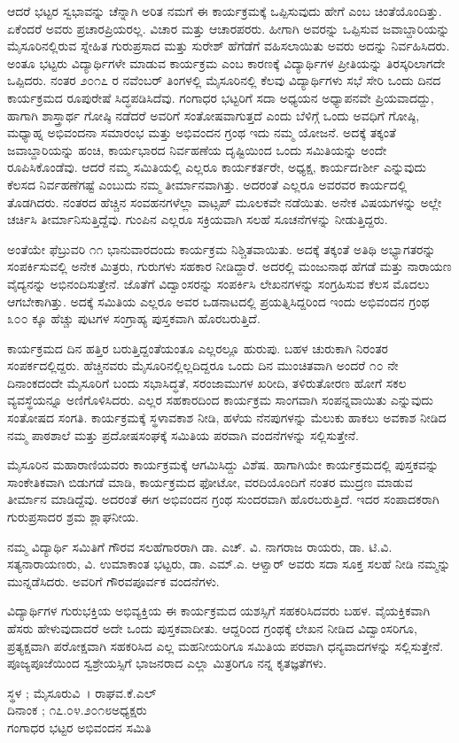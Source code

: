 {ಆದರೆ ಭಟ್ಟರ ಸ್ವಭಾವನ್ನು ಚೆನ್ನಾಗಿ ಅರಿತ ನಮಗೆ ಈ ಕಾರ್ಯಕ್ರಮಕ್ಕೆ ಒಪ್ಪಿಸುವುದು ಹೇಗೆ ಎಂಬ ಚಿಂತೆಯೊಂದಿತ್ತು. ಏಕೆಂದರೆ ಅವರು ಪ್ರಚಾರಪ್ರಿಯರಲ್ಲ. ವಿಚಾರ ಮತ್ತು ಆಚಾರಪರರು. ಹೀಗಾಗಿ ಅವರನ್ನು ಒಪ್ಪಿಸುವ ಜವಾಬ್ದಾರಿಯನ್ನು ಮೈಸೂರಿನಲ್ಲಿರುವ ಸ್ನೇಹಿತ ಗುರುಪ್ರಸಾದ ಮತ್ತು ಸುರೇಶ್ ಹೆಗೆಡೆಗೆ ವಹಿಸಲಾಯಿತು ಅವರು ಅದನ್ನು ನಿರ್ವಹಿಸಿದರು. ಅಂತೂ ಭಟ್ಟರು ವಿದ್ಯಾರ್ಥಿಗಳೇ ಮಾಡುವ ಕಾರ್ಯಕ್ರಮ ಎಂಬ ಕಾರಣಕ್ಕೆ ವಿದ್ಯಾರ್ಥಿಗಳ ಪ್ರೀತಿಯನ್ನು ತಿರಸ್ಕರಿಲಾಗದೇ ಒಪ್ಪಿದರು. ನಂತರ ೨೦೧೭ ರ ನವೆಂಬರ್ ತಿಂಗಳಲ್ಲಿ ಮೈಸೂರಿನಲ್ಲಿ ಕೆಲವು ವಿದ್ಯಾರ್ಥಿಗಳು ಸಭೆ ಸೇರಿ ಒಂದು ದಿನದ ಕಾರ್ಯಕ್ರಮದ ರೂಪುರೇಷೆ ಸಿದ್ಧಪಡಿಸಿದೆವು. ಗಂಗಾಧರ ಭಟ್ಟರಿಗೆ ಸದಾ ಅಧ್ಯಯನ ಅಧ್ಯಾಪನವೇ ಪ್ರಿಯವಾದದ್ದು, ಹಾಗಾಗಿ ಶಾಸ್ತ್ರಾರ್ಥ ಗೋಷ್ಠಿ ನಡೆದರೆ ಅವರಿಗೆ ಸಂತೋಷವಾಗುತ್ತದೆ ಎಂದು ಬೆಳಿಗ್ಗೆ ಒಂದು ಅವಧಿಗೆ ಗೋಷ್ಠಿ, ಮಧ್ಯಾಹ್ನ ಅಭಿವಂದನಾ ಸಮಾರಂಭ ಮತ್ತು ಅಭಿವಂದನ ಗ್ರಂಥ ಇದು ನಮ್ಮ ಯೋಜನೆ. ಅದಕ್ಕೆ ತಕ್ಕಂತೆ ಜವಾಬ್ದಾರಿಯನ್ನು ಹಂಚಿ, ಕಾರ್ಯಭಾರದ ನಿರ್ವಹಣೆಯ ದೃಷ್ಟಿಯಿಂದ ಒಂದು ಸಮಿತಿಯನ್ನು ಅಂದೇ ರೂಪಿಸಿಕೊಂಡೆವು. ಆದರೆ ನಮ್ಮ ಸಮಿತಿಯಲ್ಲಿ ಎಲ್ಲರೂ ಕಾರ್ಯಕರ್ತರೇ, ಅಧ್ಯಕ್ಷ, ಕಾರ್ಯದrರ್ಶೀ ಎನ್ನುವುದು ಕೆಲಸದ ನಿರ್ವಹಣೆಗಷ್ಟೆ ಎಂಬುದು ನಮ್ಮ ತೀರ್ಮಾನವಾಗಿತ್ತು. ಅದರಂತೆ ಎಲ್ಲರೂ ಅವರವರ ಕಾರ್ಯದಲ್ಲಿ ತೊಡಗಿದರು. ನಂತರದ ಹೆಚ್ಚಿನ ಸಂವಹನಗಳೆಲ್ಲಾ ವಾಟ್ಸಪ್ ಮೂಲಕವೇ ನಡೆಯಿತು. ಅನೇಕ ವಿಷಯಗಳನ್ನು ಅಲ್ಲೇ ಚರ್ಚಿಸಿ ತೀರ್ಮಾನಿಸುತ್ತಿದ್ದೆವು. ಗುಂಪಿನ ಎಲ್ಲರೂ ಸಕ್ರಿಯವಾಗಿ ಸಲಹೆ ಸೂಚನೆಗಳನ್ನು ನೀಡುತ್ತಿದ್ದರು.

ಅಂತೆಯೇ ಫೆಬ್ರುವರಿ ೧೧ ಭಾನುವಾರದಂದು ಕಾರ್ಯಕ್ರಮ ನಿಶ್ಚಿತವಾಯಿತು. ಅದಕ್ಕೆ ತಕ್ಕಂತೆ ಅತಿಥಿ ಅಭ್ಯಾಗತರನ್ನು ಸಂಪರ್ಕಿಸುವಲ್ಲಿ ಅನೇಕ ಮಿತ್ರರು, ಗುರುಗಳು ಸಹಕಾರ ನೀಡಿದ್ದಾರೆ. ಅದರಲ್ಲಿ ಮಂಜುನಾಥ ಹೆಗಡೆ ಮತ್ತು ನಾರಾಯಣ ವೈದ್ಯನನ್ನು ಅಭಿನಂದಿಸುತ್ತೇನೆ. ಜೊತೆಗೆ ವಿದ್ವಾಂಸರನ್ನು ಸಂಪರ್ಕಿಸಿ ಲೇಖನಗಳನ್ನು ಸಂಗ್ರಹಿಸುವ ಕೆಲಸ ಮೊದಲು ಆಗಬೇಕಾಗಿತ್ತು. ಅದಕ್ಕೆ ಸಮಿತಿಯ ಎಲ್ಲರೂ ಅವರ ಒಡನಾಟದಲ್ಲಿ ಪ್ರಯತ್ನಿಸಿದ್ದರಿಂದ ಇಂದು ಅಭಿವಂದನ ಗ್ರಂಥ ೩೦೦ ಕ್ಕೂ ಹೆಚ್ಚು ಪುಟಗಳ ಸಂಗ್ರಾಹ್ಯ ಪುಸ್ತಕವಾಗಿ ಹೊರಬರುತ್ತಿದೆ.

ಕಾರ್ಯಕ್ರಮದ ದಿನ ಹತ್ತಿರ ಬರುತ್ತಿದ್ದಂತೆಯಂತೂ ಎಲ್ಲರಲ್ಲೂ ಹುರುಪು. ಬಹಳ ಚುರುಕಾಗಿ ನಿರಂತರ ಸಂಪರ್ಕದಲ್ಲಿದ್ದರು. ಹೆಚ್ಚಿನವರು ಮೈಸೂರಿನಲ್ಲಿಲ್ಲದಿದ್ದರೂ ಒಂದು ದಿನ ಮುಂಚಿತವಾಗಿ ಅಂದರೆ ೧೦ ನೇ ದಿನಾಂಕದಂದೇ ಮೈಸೂರಿಗೆ ಬಂದು ಸಭಾಸಿದ್ಧತೆ, ಸರಂಜಾಮುಗಳ ಖರೀದಿ, ತಳಿರುತೋರಣ ಹೋಗೆ ಸಕಲ ವ್ಯವಸ್ಥೆಯನ್ನೂ ಅಣಿಗೊಳಿಸಿದರು. ಎಲ್ಲರ ಸಹಕಾರದಿಂದ ಕಾರ್ಯಕ್ರಮ ಸಾಂಗವಾಗಿ ಸಂಪನ್ನವಾಯಿತು ಎನ್ನುವುದು ಸಂತೋಷದ ಸಂಗತಿ. ಕಾರ್ಯಕ್ರಮಕ್ಕೆ ಸ್ಥಳಾವಕಾಶ ನೀಡಿ, ಹಳೆಯ ನೆನಪುಗಳನ್ನು ಮೆಲುಕು ಹಾಕಲು ಅವಕಾಶ ನೀಡಿದ ನಮ್ಮ ಪಾಠಶಾಲೆ ಮತ್ತು ಪ್ರದೋಷಸಂಘಕ್ಕೆ ಸಮಿತಿಯ ಪರವಾಗಿ ವಂದನೆಗಳನ್ನು ಸಲ್ಲಿಸುತ್ತೇನೆ.

ಮೈಸೂರಿನ ಮಹಾರಾಣಿಯವರು ಕಾರ್ಯಕ್ರಮಕ್ಕೆ ಆಗಮಿಸಿದ್ದು ವಿಶೆಷ. ಹಾಗಾಗಿಯೇ ಕಾರ್ಯಕ್ರಮದಲ್ಲಿ ಪುಸ್ತಕವನ್ನು ಸಾಂಕೇತಿಕವಾಗಿ ಬಿಡುಗಡೆ ಮಾಡಿ, ಕಾರ್ಯಕ್ರಮದ ಫೋಟೋ, ವರದಿಯೊಂದಿಗೆ ನಂತರ ಮುದ್ರಣ ಮಾಡುವ ತೀರ್ಮಾನ ಮಾಡಿದ್ದೆವು. ಅದರಂತೆ ಈಗ ಅಭಿವಂದನ ಗ್ರಂಥ ಸುಂದರವಾಗಿ ಹೊರಬರುತ್ತಿದೆ. ಇದರ ಸಂಪಾದಕರಾಗಿ ಗುರುಪ್ರಸಾದರ ಶ್ರಮ ಶ್ಲಾಘನೀಯ.

ನಮ್ಮ ವಿದ್ಯಾರ್ಥಿ ಸಮಿತಿಗೆ ಗೌರವ ಸಲಹೆಗಾರರಾಗಿ ಡಾ. ಎಚ್. ವಿ. ನಾಗರಾಜ ರಾಯರು, ಡಾ. ಟಿ.ವಿ. ಸತ್ಯನಾರಾಯಣರು, ವಿ. ಉಮಾಕಾಂತ ಭಟ್ಟರು, ಡಾ. ಎಮ್.ಎ. ಆಳ್ವಾರ್ ಅವರು ಸದಾ ಸೂಕ್ತ ಸಲಹೆ ನೀಡಿ ನಮ್ಮನ್ನು ಮುನ್ನಡೆಸಿದರು. ಅವರಿಗೆ ಗೌರವಪೂರ್ವಕ ವಂದನೆಗಳು.

ವಿದ್ಯಾರ್ಥಿಗಳ ಗುರುಭಕ್ತಿಯ ಅಭಿವ್ಯಕ್ತಿಯ ಈ ಕಾರ್ಯಕ್ರಮದ ಯಶಸ್ಸಿಗೆ ಸಹಕರಿಸಿದವರು ಬಹಳ. ವೈಯಕ್ತಿಕವಾಗಿ ಹೆಸರು ಹೇಳುವುದಾದರೆ ಅದೇ ಒಂದು ಪುಸ್ತಕವಾದೀತು. ಆದ್ದರಿಂದ ಗ್ರಂಥಕ್ಕೆ ಲೇಖನ ನೀಡಿದ ವಿದ್ವಾಂಸರಿಗೂ, ಪ್ರತ್ಯಕ್ಷವಾಗಿ ಪರೋಕ್ಷವಾಗಿ ಸಹಕರಿಸಿದ ಎಲ್ಲ ಮಹನೀಯರಿಗೂ ಸಮಿತಿಯ ಪರವಾಗಿ ಧನ್ಯವಾದಗಳನ್ನು ಸಲ್ಲಿಸುತ್ತೇನೆ. ಪೂಜ್ಯಪೂಜೆಯಿಂದ ಸ್ವಶ್ರೇಯಸ್ಸಿಗೆ ಭಾಜನರಾದ ಎಲ್ಲಾ ಮಿತ್ರರಿಗೂ ನನ್ನ ಕೃತಜ್ಞತೆಗಳು.
\bigskip

\noindent ಸ್ಥಳ ; ಮೈಸೂರು\hfill				           ವಿ~। ರಾಘವ.ಕೆ.ಎಲ್\\
ದಿನಾಂಕ ; ೧೭.೦೪.೨೦೧೮\hfill  						    ಅಧ್ಯಕ್ಷರು\\
\phantom{i}\hfill ಗಂಗಾಧರ ಭಟ್ಟರ ಅಭಿವಂದನ ಸಮಿತಿ


\articleend
}
